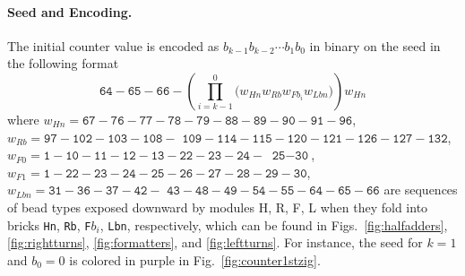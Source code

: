 \documentclass[runningheads]{llncs}
\begin{document}
\paragraph{Seed and Encoding.}
The initial counter value is encoded as $b_{k-1}b_{k-2} \cdots b_1b_0$ in binary on the seed in the following format
\begin{equation} \label{eq:zagencoding}
\texttt{64}{-}\texttt{65}{-}\texttt{66}{-}\left( \prod^0_{i = k-1} \bigl(  w_{Hn} w_{Rb} w_{Fb_i} w_{Lbn} \bigr) \right) w_{Hn}
\end{equation}
where 
$w_{Hn}= \texttt{67}{-}\texttt{76}{-}\texttt{77}{-}\texttt{78}{-}\texttt{79}{-}\texttt{88}{-}\texttt{89}{-}\texttt{90}{-}\texttt{91}{-}\texttt{96}$, 
$w_{Rb}=\texttt{97}{-}\texttt{102}{-}\texttt{103}{-}\texttt{108}{-}$ $\texttt{109}{-}\texttt{114}{-}\texttt{115}{-}\texttt{120}{-}\texttt{121}{-}\texttt{126}{-}\texttt{127}{-}\texttt{132}$, 
$w_{F0} = \texttt{1}{-}\texttt{10}{-}\texttt{11}{-}\texttt{12}{-}\texttt{13}{-}\texttt{22}{-}\texttt{23}{-}\texttt{24}{-}$ $\texttt{25}{-}\texttt{30}$, 
$w_{F1}=\texttt{1}{-}\texttt{22}{-}\texttt{23}{-}\texttt{24}{-}\texttt{25}{-}\texttt{26}{-}\texttt{27}{-}\texttt{28}{-}\texttt{29}{-}\texttt{30}$, 
$w_{Lbn}= \texttt{31}{-}\texttt{36}{-}\texttt{37}{-}\texttt{42}{-}$ $\texttt{43}{-}\texttt{48}{-}\texttt{49}{-}\texttt{54}{-}\texttt{55}{-}\texttt{64}{-}\texttt{65}{-}\texttt{66}$
are sequences of bead types exposed downward by modules H, R, F, L when they fold into bricks \texttt{Hn}, \texttt{Rb}, \texttt{F}$b_i$, \texttt{Lbn}, respectively, which can be found in Figs.~\ref{fig:halfadders}, \ref{fig:rightturns}, \ref{fig:formatters}, and \ref{fig:leftturns}.
For instance, the seed for $k = 1$ and $b_0 = 0$ is colored in purple in Fig.~\ref{fig:counter1stzig}.
\end{document}
